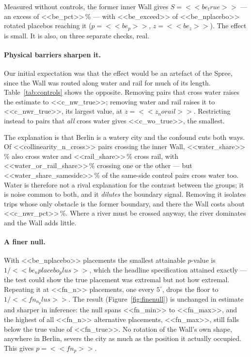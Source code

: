 \documentclass[11pt,a4paper]{article}
\begin{document}
Measured without controls, the former inner Wall gives $S = <<be_true>>$ ---
an excess of <<be_pct>>\,\% --- with <<be_exceed>> of <<be_nplacebo>> rotated
placebos reaching it ($p = <<be_p>>$, $z = <<be_z>>$). The effect is small. It
is also, on three separate checks, real.

\paragraph{Physical barriers sharpen it.} Our initial expectation was that the
effect would be an artefact of the Spree, since the Wall was routed along water
and rail for much of its length. Table~\ref{tab:controls} shows the opposite.
Removing pairs that cross water raises the estimate to <<c_nw_true>>; removing
water and rail raises it to <<c_nwr_true>>, its largest value, at $z =
<<z_norail>>$. Restricting instead to pairs that \emph{all} cross water gives
<<c_wo_true>>, the smallest.

The explanation is that Berlin is a watery city and the confound cuts both ways.
Of <<collinearity_n_cross>> pairs crossing the inner Wall, <<water_share>>\,\%
also cross water and <<rail_share>>\,\% cross rail, with
<<water_or_rail_share>>\,\% crossing one or the other --- but
<<water_share_sameside>>\,\% of the same-side control pairs cross water too.
Water is therefore not a rival explanation for the contrast between the groups;
it is noise common to both, and it \emph{dilutes} the boundary signal. Removing
it isolates trips whose only obstacle is the former boundary, and there the Wall
costs about <<c_nwr_pct>>\,\%. Where a river must be crossed anyway, the river
dominates and the Wall adds little.

\paragraph{A finer null.} With <<be_nplacebo>> placements the smallest
attainable $p$-value is $1/<<be_nplacebo_plus>>$, which the headline
specification attained exactly --- the test could show the true placement was
extremal but not how extremal. Repeating it at <<fn_n>> placements, one every
$5^{\circ}$, drops the floor to $1/<<fn_n_plus>>$. The result
(Figure~\ref{fig:finenull}) is unchanged in estimate and sharper in inference:
the null spans <<fn_min>> to <<fn_max>>, and the highest of all <<fn_n>>
alternative placements, <<fn_max>>, still falls below the true value of
<<fn_true>>. No rotation of the Wall's own shape, anywhere in Berlin, severs
the city as much as the position it actually occupied. This gives
$p = <<fn_p>>$.
\end{document}
